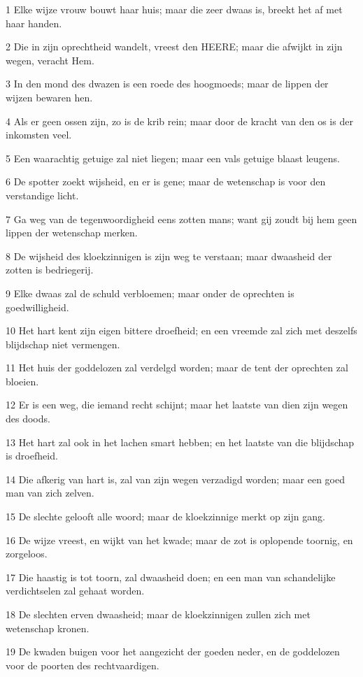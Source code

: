 \par 1 Elke wijze vrouw bouwt haar huis; maar die zeer dwaas is, breekt het af met haar handen.
\par 2 Die in zijn oprechtheid wandelt, vreest den HEERE; maar die afwijkt in zijn wegen, veracht Hem.
\par 3 In den mond des dwazen is een roede des hoogmoeds; maar de lippen der wijzen bewaren hen.
\par 4 Als er geen ossen zijn, zo is de krib rein; maar door de kracht van den os is der inkomsten veel.
\par 5 Een waarachtig getuige zal niet liegen; maar een vals getuige blaast leugens.
\par 6 De spotter zoekt wijsheid, en er is gene; maar de wetenschap is voor den verstandige licht.
\par 7 Ga weg van de tegenwoordigheid eens zotten mans; want gij zoudt bij hem geen lippen der wetenschap merken.
\par 8 De wijsheid des kloekzinnigen is zijn weg te verstaan; maar dwaasheid der zotten is bedriegerij.
\par 9 Elke dwaas zal de schuld verbloemen; maar onder de oprechten is goedwilligheid.
\par 10 Het hart kent zijn eigen bittere droefheid; en een vreemde zal zich met deszelfs blijdschap niet vermengen.
\par 11 Het huis der goddelozen zal verdelgd worden; maar de tent der oprechten zal bloeien.
\par 12 Er is een weg, die iemand recht schijnt; maar het laatste van dien zijn wegen des doods.
\par 13 Het hart zal ook in het lachen smart hebben; en het laatste van die blijdschap is droefheid.
\par 14 Die afkerig van hart is, zal van zijn wegen verzadigd worden; maar een goed man van zich zelven.
\par 15 De slechte gelooft alle woord; maar de kloekzinnige merkt op zijn gang.
\par 16 De wijze vreest, en wijkt van het kwade; maar de zot is oplopende toornig, en zorgeloos.
\par 17 Die haastig is tot toorn, zal dwaasheid doen; en een man van schandelijke verdichtselen zal gehaat worden.
\par 18 De slechten erven dwaasheid; maar de kloekzinnigen zullen zich met wetenschap kronen.
\par 19 De kwaden buigen voor het aangezicht der goeden neder, en de goddelozen voor de poorten des rechtvaardigen.
